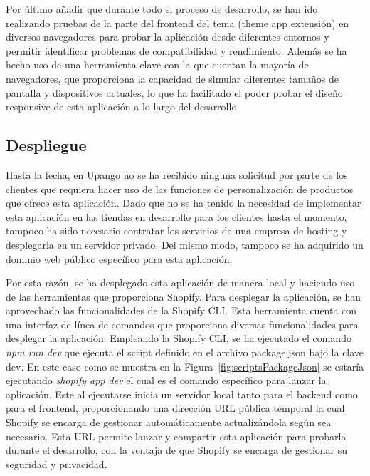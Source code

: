 \documentclass[12pt]{article}
\begin{document}
Por último añadir que durante todo el proceso de desarrollo, se han ido realizando pruebas de la parte del frontend del tema (theme app extensión) en diversos
navegadores para probar la aplicación desde diferentes entornos y permitir identificar problemas de compatibilidad y rendimiento.
Además se ha hecho uso de una herramienta clave con la que cuentan la mayoría de navegadores, que proporciona la capacidad de simular diferentes 
tamaños de pantalla y dispositivos actuales, lo que ha facilitado el poder probar el diseño responsive de esta aplicación a lo largo del desarrollo.

\subsection{Despliegue}
Hasta la fecha, en Upango no se ha recibido ninguna solicitud por parte de los clientes que requiera hacer uso de las funciones de personalización de productos
que ofrece esta aplicación. Dado que no se ha tenido la necesidad de implementar esta aplicación en las tiendas en desarrollo para los clientes hasta el momento, tampoco ha sido 
necesario contratar los servicios de una empresa de hosting y desplegarla en un servidor privado. Del mismo modo, tampoco se ha adquirido un dominio web público 
específico para esta aplicación.

Por esta razón, se ha desplegado esta aplicación de manera local y haciendo uso de las herramientas que proporciona Shopify. Para desplegar la aplicación,
se han aprovechado las funcionalidades de la Shopify CLI. Esta herramienta cuenta con una interfaz de línea de comandos que proporciona diversas funcionalidades para desplegar la aplicación.
Empleando la Shopify CLI, se ha ejecutado el comando \textit{npm run dev} que ejecuta el script definido en el archivo package.json bajo la clave dev. En este caso como se muestra en la Figura~\ref{fig:scriptsPackageJson} se estaría ejecutando \textit{shopify app dev} el cual es el comando específico para lanzar la aplicación.
Este al ejecutarse inicia un servidor local tanto para el backend como para el frontend, proporcionando
una dirección URL pública temporal la cual Shopify se encarga de gestionar automáticamente actualizándola según sea necesario. Esta URL permite lanzar y compartir esta aplicación para probarla durante el desarrollo, con la ventaja de que 
Shopify se encarga de gestionar su seguridad y privacidad.
\end{document}
